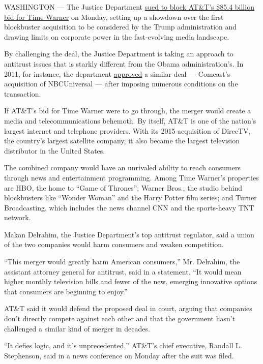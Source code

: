 WASHINGTON --- The Justice Department
\href{https://www.nytimes.com/interactive/2017/11/20/business/dealbook/att-time-warner-lawsuit.html}{sued
to block AT\&T's \$85.4 billion bid for Time Warner} on Monday, setting
up a showdown over the first blockbuster acquisition to be considered by
the Trump administration and drawing limits on corporate power in the
fast-evolving media landscape.

By challenging the deal, the Justice Department is taking an approach to
antitrust issues that is starkly different from the Obama
administration's. In 2011, for instance, the department
\href{http://www.nytimes.com/2011/01/19/business/media/19comcast.html}{approved}
a similar deal --- Comcast's acquisition of NBCUniversal --- after
imposing numerous conditions on the transaction.

If AT\&T's bid for Time Warner were to go through, the merger would
create a media and telecommunications behemoth. By itself, AT\&T is one
of the nation's largest internet and telephone providers. With its 2015
acquisition of DirecTV, the country's largest satellite company, it also
became the largest television distributor in the United States.

The combined company would have an unrivaled ability to reach consumers
through news and entertainment programming. Among Time Warner's
properties are HBO, the home to ``Game of Thrones''; Warner Bros., the
studio behind blockbusters like ``Wonder Woman'' and the Harry Potter
film series; and Turner Broadcasting, which includes the news channel
CNN and the sports-heavy TNT network.

Makan Delrahim, the Justice Department's top antitrust regulator, said a
union of the two companies would harm consumers and weaken competition.

``This merger would greatly harm American consumers,'' Mr. Delrahim, the
assistant attorney general for antitrust, said in a statement. ``It
would mean higher monthly television bills and fewer of the new,
emerging innovative options that consumers are beginning to enjoy.''

AT\&T said it would defend the proposed deal in court, arguing that
companies don't directly compete against each other and that the
government hasn't challenged a similar kind of merger in decades.

``It defies logic, and it's unprecedented,'' AT\&T's chief executive,
Randall L. Stephenson, said in a news conference on Monday after the
suit was filed.

